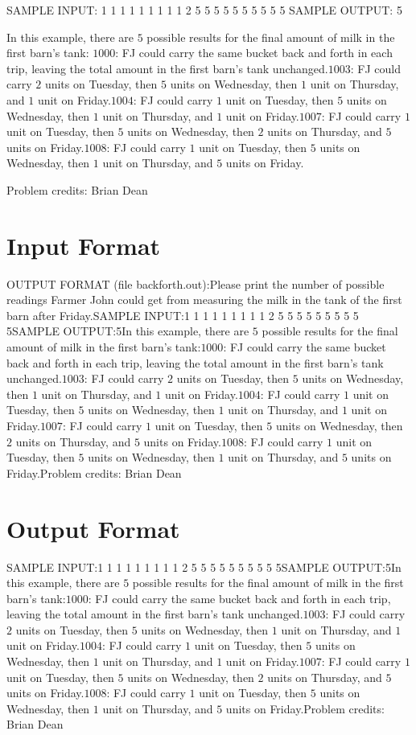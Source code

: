 \documentclass[12pt]{article}
\begin{document}
SAMPLE INPUT:
1 1 1 1 1 1 1 1 1 2
5 5 5 5 5 5 5 5 5 5
SAMPLE OUTPUT: 
5

In this example, there are $5$ possible results for the final amount of milk in
the first barn's tank:
$1000$: FJ could carry the same bucket back and forth in each trip, leaving
the total amount in the first barn's tank unchanged.$1003$: FJ could carry $2$ units on Tuesday, then $5$ units on Wednesday, then $1$
unit on Thursday, and $1$ unit on Friday.$1004$: FJ could carry $1$ unit on Tuesday, then $5$ units on Wednesday, then $1$
unit on Thursday, and $1$ unit on Friday.$1007$: FJ could carry $1$ unit on Tuesday, then $5$ units on Wednesday, then $2$
units on Thursday, and $5$ units on Friday.$1008$: FJ could carry $1$ unit on Tuesday, then $5$ units on Wednesday, then $1$
unit on Thursday, and $5$ units on Friday.

Problem credits: Brian Dean



\section*{Input Format}
OUTPUT FORMAT (file backforth.out):Please print the number of possible readings Farmer John could get from
measuring the milk in the tank of the first barn after Friday.SAMPLE INPUT:1 1 1 1 1 1 1 1 1 2
5 5 5 5 5 5 5 5 5 5SAMPLE OUTPUT:5In this example, there are $5$ possible results for the final amount of milk in
the first barn's tank:$1000$: FJ could carry the same bucket back and forth in each trip, leaving
the total amount in the first barn's tank unchanged.$1003$: FJ could carry $2$ units on Tuesday, then $5$ units on Wednesday, then $1$
unit on Thursday, and $1$ unit on Friday.$1004$: FJ could carry $1$ unit on Tuesday, then $5$ units on Wednesday, then $1$
unit on Thursday, and $1$ unit on Friday.$1007$: FJ could carry $1$ unit on Tuesday, then $5$ units on Wednesday, then $2$
units on Thursday, and $5$ units on Friday.$1008$: FJ could carry $1$ unit on Tuesday, then $5$ units on Wednesday, then $1$
unit on Thursday, and $5$ units on Friday.Problem credits: Brian Dean

\section*{Output Format}
SAMPLE INPUT:1 1 1 1 1 1 1 1 1 2
5 5 5 5 5 5 5 5 5 5SAMPLE OUTPUT:5In this example, there are $5$ possible results for the final amount of milk in
the first barn's tank:$1000$: FJ could carry the same bucket back and forth in each trip, leaving
the total amount in the first barn's tank unchanged.$1003$: FJ could carry $2$ units on Tuesday, then $5$ units on Wednesday, then $1$
unit on Thursday, and $1$ unit on Friday.$1004$: FJ could carry $1$ unit on Tuesday, then $5$ units on Wednesday, then $1$
unit on Thursday, and $1$ unit on Friday.$1007$: FJ could carry $1$ unit on Tuesday, then $5$ units on Wednesday, then $2$
units on Thursday, and $5$ units on Friday.$1008$: FJ could carry $1$ unit on Tuesday, then $5$ units on Wednesday, then $1$
unit on Thursday, and $5$ units on Friday.Problem credits: Brian Dean
\end{document}
